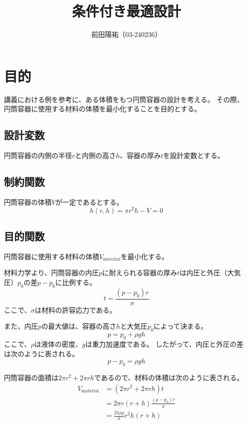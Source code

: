 \documentclass{jsarticle}
\begin{document}
\title{条件付き最適設計}
\author{前田陽祐（03-240236）}
\maketitle

\section{目的}
講義における例を参考に、ある体積をもつ円筒容器の設計を考える。
その際、円筒容器に使用する材料の体積を最小化することを目的とする。

\subsection{設計変数}
円筒容器の内側の半径$r$と内側の高さ$h$、容器の厚み$t$を設計変数とする。

\subsection{制約関数}
円筒容器の体積$V$が一定であるとする。
\begin{equation}
  h(r, h) = \pi r^2 h - V = 0
\end{equation}

\subsection{目的関数}
円筒容器に使用する材料の体積$V_{\text{material}}$を最小化する。

材料力学より、円筒容器の内圧$p$に耐えられる容器の厚み$t$は内圧と外圧（大気圧）$p_0$の差$p-p_0$に比例する。
\begin{equation}
  t = \frac{(p-p_0) r}{\sigma}
\end{equation}
ここで、$\sigma$は材料の許容応力である。

また、内圧$p$の最大値は、容器の高さ$h$と大気圧$p_0$によって決まる。
\begin{equation}
  p = p_0 + \rho g h
\end{equation}
ここで、$\rho$は液体の密度、$g$は重力加速度である。
したがって、内圧と外圧の差は次のように表される。
\begin{equation}
  p - p_0 = \rho g h
\end{equation}

円筒容器の面積は$2\pi r^2 + 2\pi r h$であるので、材料の体積は次のように表される。
\begin{align}
  V_{\text{material}} &= (2\pi r^2 + 2\pi r h) t \\
                      &=  2\pi r (r+h) \frac{(p-p_0) r}{\sigma} \\
                      &= \frac{2\pi\rho g }{\sigma} r^2 h(r+h)
\end{align}
\end{document}
